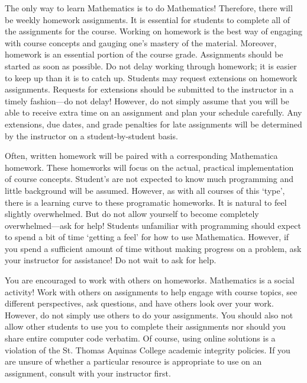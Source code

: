 \documentclass[11pt,letterpaper]{article}
\begin{document}
The only way to learn Mathematics is to do Mathematics! Therefore, there will be weekly homework assignments. It is essential for students to complete all of the assignments for the course. Working on homework is the best way of engaging with course concepts and gauging one's mastery of the material. Moreover, homework is an essential portion of the course grade. Assignments should be started as soon as possible. Do not delay working through homework; it is easier to keep up than it is to catch up. Students may request extensions on homework assignments. Requests for extensions should be submitted to the instructor in a timely fashion---do not delay! However, do not simply assume that you will be able to receive extra time on an assignment and plan your schedule carefully. Any extensions, due dates, and grade penalties for late assignments will be determined by the instructor on a student-by-student basis. \pspace

Often, written homework will be paired with a corresponding Mathematica homework. These homeworks will focus on the actual, practical implementation of course concepts. Student's are not expected to know much programming and little background will be assumed. However, as with all courses of this `type', there is a learning curve to these programatic homeworks. It is natural to feel slightly overwhelmed. But do not allow yourself to become completely overwhelmed---ask for help! Students unfamiliar with programming should expect to spend a bit of time `getting a feel' for how to use Mathematica. However, if you spend a sufficient amount of time without making progress on a problem, ask your instructor for assistance! Do not wait to ask for help. \pspace

You are encouraged to work with others on homeworks. Mathematics is a social activity! Work with others on assignments to help engage with course topics, see different perspectives, ask questions, and have others look over your work. However, do not simply use others to do your assignments. You should also not allow other students to use you to complete their assignments nor should you share entire computer code verbatim. Of course, using online solutions is a violation of the St. Thomas Aquinas College academic integrity policies. If you are unsure of whether a particular resource is appropriate to use on an assignment, consult with your instructor first. \sectionbreak
\end{document}
